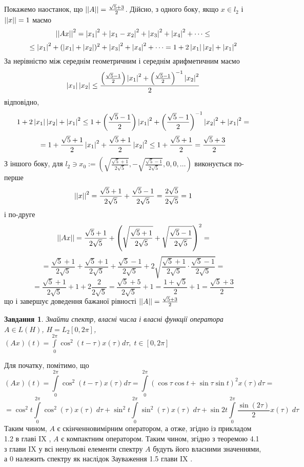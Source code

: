 \documentclass[12pt]{article} %
\newtheorem{prob}{Завдання}
\let\oldint\int
\renewcommand{\int}{\oldint\limits}
\begin{document}
	Покажемо наостанок, що $\left|\left|A\right|\right|=\frac{\sqrt{5}+3}{2}$. Дійсно, з одного боку, якщо $x\in l_2$ і $\left|\left|x\right|\right|=1$ маємо
	\[\left|\left|Ax\right|\right|^2=\left|x_1\right|^2+\left|x_1-x_2\right|^2+\left|x_3\right|^2+\left|x_4\right|^2+\dots\leq\]
	\[\leq \left|x_1\right|^2+(\left|x_1\right|+\left|x_2\right|)^2+\left|x_3\right|^2+\left|x_4\right|^2+\dots=1+2\left|x_1\right|\left|x_2\right|+\left|x_1\right|^2\]
	За нерівністю між середнім геометричним і середнім арифметичним маємо
	\[\left|x_1\right|\left|x_2\right|\leq\frac{\left({\frac{\sqrt{5}-1}{2}}\right)\left|x_1\right|^2+\left(\frac{\sqrt{5}-1}{2}\right)^{-1}\left|x_2\right|^2}{2}\]
	відповідно,
	\[1+2\left|x_1\right|\left|x_2\right|+\left|x_1\right|^2
	\leq1+\left({\frac{\sqrt{5}-1}{2}}\right)\left|x_1\right|^2+\left(\frac{\sqrt{5}-1}{2}\right)^{-1}\left|x_2\right|^2+\left|x_1\right|^2=\]
	\[=1+\frac{\sqrt{5}+1}{2}\left|x_1\right|^2+\frac{\sqrt{5}+1}{2}\left|x_2\right|^2\leq 1+\frac{\sqrt{5}+1}{2}=\frac{\sqrt{5}+3}{2}\]
	З іншого боку, для $l_2\ni x_0:=(\sqrt{\frac{\sqrt{5}+1}{2\sqrt{5}}},-\sqrt{\frac{\sqrt{5}-1}{2\sqrt{5}}},0,0,\dots)$ виконується
	по-перше
	\[\left|\left|x\right|\right|^2=\frac{\sqrt{5}+1}{2\sqrt{5}}+\frac{\sqrt{5}-1}{2\sqrt{5}}=\frac{2\sqrt{5}}{2\sqrt{5}}=1\]
	і по-друге
	\[\left|\left|Ax\right|\right|=\frac{\sqrt{5}+1}{2\sqrt{5}}+\left(\sqrt{\frac{\sqrt{5}+1}{2\sqrt{5}}}+\sqrt{\frac{\sqrt{5}-1}{2\sqrt{5}}}\right)^2=\]\[=
	\frac{\sqrt{5}+1}{2\sqrt{5}}+\frac{\sqrt{5}+1}{2\sqrt{5}}+{\frac{\sqrt{5}-1}{2\sqrt{5}}}+2\sqrt{
	\frac{\sqrt{5}+1}{2\sqrt{5}}\cdot\frac{\sqrt{5}-1}{2\sqrt{5}}}=\]
	\[=\frac{\sqrt{5}+1}{2\sqrt{5}}+1+2\frac{2}{2\sqrt{5}}=\frac{\sqrt{5}+5}{2\sqrt{5}}+1=\frac{1+\sqrt{5}}{2}+1=\frac{\sqrt{5}+3}{2}\]
	що і завершує доведення бажаної рівності $\left|\left|A\right|\right|=\frac{\sqrt{5}+3}{2}$
\begin{prob}Знайти спектр, власні числа і власні функції оператора $A\in L(H)$, $H=L_2[0,2\pi]$, $(Ax)(t)=\int_0^{2\pi}\cos^2(t-\tau)x(\tau)
	d\tau,\;t\in[0,2\pi]$
\end{prob}
Для початку, помітимо, що
\newcommand{\myint}[1]{\int_0^{2\pi}#1x(\tau)\;d\tau}
\newcommand{\mysint}[1]{\int_0^{2\pi}#1\;d\tau}
\[(Ax)(t)=\int_0^{2\pi}\cos^2(t-\tau)x(\tau)d\tau=\int_0^{2\pi}(\cos\tau\cos t+\sin\tau\sin t)^2x(\tau)d\tau=\]
\[=\cos^2 t\myint{\cos^2(\tau)}+\sin^2 t\myint{\sin^2(\tau)}+\sin 2t\myint{\frac{\sin (2\tau)}{2}}\]
Таким чином, $A$ є скінченновимірним оператором, а отже, згідно із прикладом 1.2 в главі IX \cite{tb}, 
$A$ є компактним оператором. Таким чином, згідно з теоремою 4.1 з глави IX у \cite{tb} всі ненульові елементи спектру $A$ будуть його власними
значеннями, а $0$ належить спектру як наслідок Зауваження 1.5 глави IX \cite{tb}.
\end{document}
